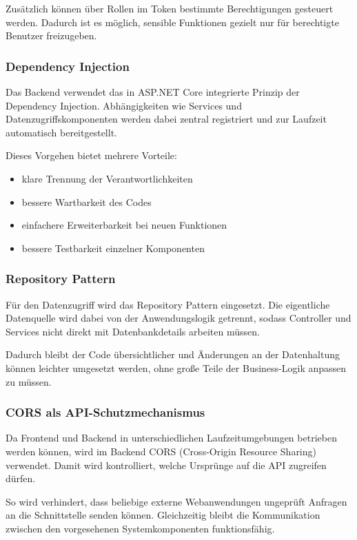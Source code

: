 Zusätzlich können über Rollen im Token bestimmte Berechtigungen gesteuert werden. Dadurch ist es möglich, sensible Funktionen gezielt nur für berechtigte Benutzer freizugeben.

\subsubsection{Dependency Injection}

Das Backend verwendet das in ASP.NET Core integrierte Prinzip der Dependency Injection. Abhängigkeiten wie Services und Datenzugriffskomponenten werden dabei zentral registriert und zur Laufzeit automatisch bereitgestellt.

Dieses Vorgehen bietet mehrere Vorteile:

\begin{itemize}
    \item klare Trennung der Verantwortlichkeiten
    \item bessere Wartbarkeit des Codes
    \item einfachere Erweiterbarkeit bei neuen Funktionen
    \item bessere Testbarkeit einzelner Komponenten
\end{itemize}

\subsubsection{Repository Pattern}

Für den Datenzugriff wird das Repository Pattern eingesetzt. Die eigentliche Datenquelle wird dabei von der Anwendungslogik getrennt, sodass Controller und Services nicht direkt mit Datenbankdetails arbeiten müssen.

Dadurch bleibt der Code übersichtlicher und Änderungen an der Datenhaltung können leichter umgesetzt werden, ohne große Teile der Business-Logik anpassen zu müssen.

\subsubsection{CORS als API-Schutzmechanismus}

Da Frontend und Backend in unterschiedlichen Laufzeitumgebungen betrieben werden können, wird im Backend CORS (Cross-Origin Resource Sharing) verwendet. Damit wird kontrolliert, welche Ursprünge auf die API zugreifen dürfen.

So wird verhindert, dass beliebige externe Webanwendungen ungeprüft Anfragen an die Schnittstelle senden können. Gleichzeitig bleibt die Kommunikation zwischen den vorgesehenen Systemkomponenten funktionsfähig.


